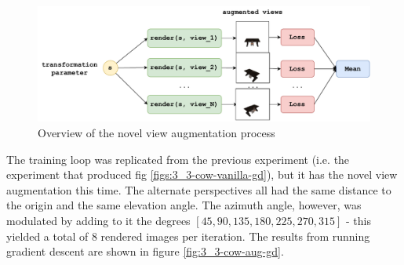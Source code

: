 \begin{figure}[H]
    \centering
    \includegraphics[width=1.0\textwidth]{figures/3_3-novel-view-aug.pdf}
    \caption{Overview of the novel view augmentation process}
    \label{fig:3_3-novel-view-aug}
\end{figure}


The training loop was replicated from the previous experiment (i.e. the experiment that produced fig \ref{figs:3_3-cow-vanilla-gd}), but it has the novel view augmentation this time. The alternate perspectives all had the same distance to the origin and the same elevation angle. The azimuth angle, however, was modulated by adding to it the degrees $[45, 90, 135, 180, 225, 270, 315]$ - this yielded a total of 8 rendered images per iteration. The results from running gradient descent are shown in figure \ref{fig:3_3-cow-aug-gd}.

